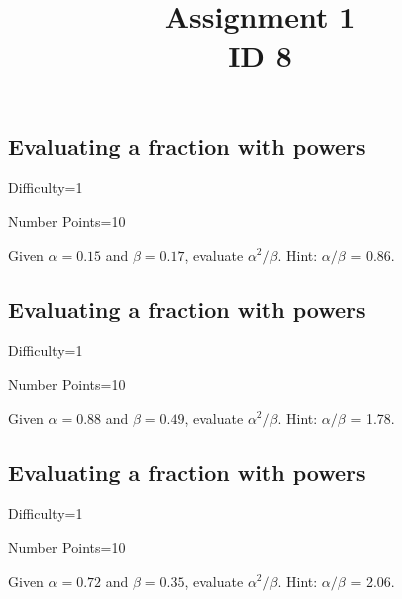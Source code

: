 \documentclass{article}
\title{Assignment 1 \\ ID 8}
\begin{document}
\maketitle

\section{} 



\subsection{Evaluating a fraction with powers}

Difficulty=1

Number Points=10

Given $\alpha = 0.15$ and $\beta = 0.17$, evaluate $\alpha^{2}/\beta$. Hint: $\alpha/\beta$ = 0.86.

\subsection{Evaluating a fraction with powers}

Difficulty=1

Number Points=10

Given $\alpha = 0.88$ and $\beta = 0.49$, evaluate $\alpha^{2}/\beta$. Hint: $\alpha/\beta$ = 1.78.

\subsection{Evaluating a fraction with powers}

Difficulty=1

Number Points=10

Given $\alpha = 0.72$ and $\beta = 0.35$, evaluate $\alpha^{2}/\beta$. Hint: $\alpha/\beta$ = 2.06.
\end{document}
